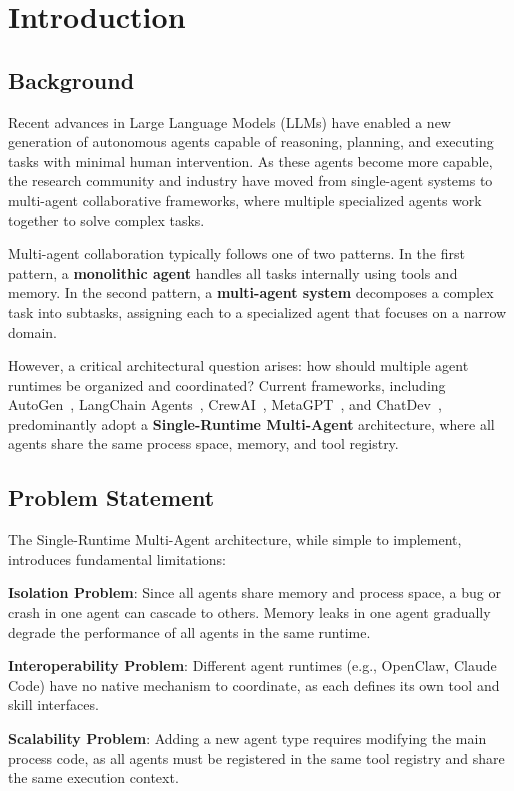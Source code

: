 \section{Introduction}

\subsection{Background}
Recent advances in Large Language Models (LLMs) have enabled a new generation of autonomous agents capable of reasoning, planning, and executing tasks with minimal human intervention. As these agents become more capable, the research community and industry have moved from single-agent systems to multi-agent collaborative frameworks, where multiple specialized agents work together to solve complex tasks.

Multi-agent collaboration typically follows one of two patterns. In the first pattern, a \textbf{monolithic agent} handles all tasks internally using tools and memory. In the second pattern, a \textbf{multi-agent system} decomposes a complex task into subtasks, assigning each to a specialized agent that focuses on a narrow domain.

However, a critical architectural question arises: how should multiple agent runtimes be organized and coordinated? Current frameworks, including AutoGen~\citep{wu2023autogen}, LangChain Agents~\citep{langchain}, CrewAI~\citep{crewai}, MetaGPT~\citep{hong2024metagpt}, and ChatDev~\citep{qian2024chatdev}, predominantly adopt a \textbf{Single-Runtime Multi-Agent} architecture, where all agents share the same process space, memory, and tool registry.

\subsection{Problem Statement}
The Single-Runtime Multi-Agent architecture, while simple to implement, introduces fundamental limitations:

\textbf{Isolation Problem}: Since all agents share memory and process space, a bug or crash in one agent can cascade to others. Memory leaks in one agent gradually degrade the performance of all agents in the same runtime.

\textbf{Interoperability Problem}: Different agent runtimes (e.g., OpenClaw, Claude Code) have no native mechanism to coordinate, as each defines its own tool and skill interfaces.

\textbf{Scalability Problem}: Adding a new agent type requires modifying the main process code, as all agents must be registered in the same tool registry and share the same execution context.

